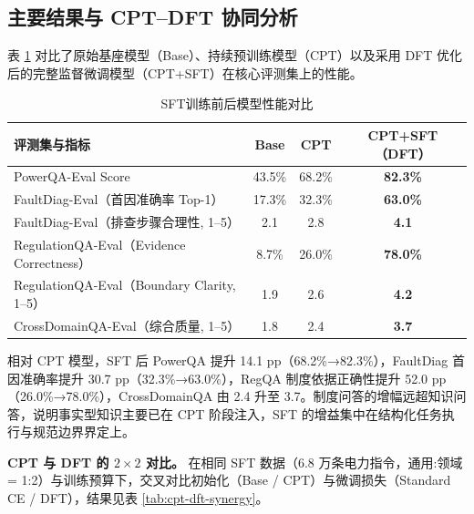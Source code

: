 \documentclass[fontset=fandol,type=master,campus=shenzhen,etitleauto=true]{hithesisbook}
\begin{document}
\subsection{主要结果与 CPT--DFT 协同分析}\label{ux4e3bux8981ux7ed3ux679c-2}

表 \ref{tab:sft-results} 对比了原始基座模型（Base）、持续预训练模型（CPT）以及采用 DFT 优化后的完整监督微调模型（CPT+SFT）在核心评测集上的性能。

\begin{table}[htbp]
\centering
\caption{SFT训练前后模型性能对比}
\label{tab:sft-results}
\small
\begin{tabular}{l c c c}
\toprule
\textbf{评测集与指标} & \textbf{Base} & \textbf{CPT} & \textbf{CPT+SFT（DFT）} \\
\midrule
PowerQA-Eval Score & 43.5\% & 68.2\% & \textbf{82.3\%} \\
FaultDiag-Eval（首因准确率 Top-1） & 17.3\% & 32.3\% & \textbf{63.0\%} \\
FaultDiag-Eval（排查步骤合理性, 1--5） & 2.1 & 2.8 & \textbf{4.1} \\
RegulationQA-Eval（Evidence Correctness） & 8.7\% & 26.0\% & \textbf{78.0\%} \\
RegulationQA-Eval（Boundary Clarity, 1--5） & 1.9 & 2.6 & \textbf{4.2} \\
CrossDomainQA-Eval（综合质量, 1--5） & 1.8 & 2.4 & \textbf{3.7} \\
\bottomrule
\end{tabular}
\end{table}

相对 CPT 模型，SFT 后 PowerQA 提升 14.1 pp（68.2\%→82.3\%），FaultDiag 首因准确率提升 30.7 pp（32.3\%→63.0\%），RegQA 制度依据正确性提升 52.0 pp（26.0\%→78.0\%），CrossDomainQA 由 2.4 升至 3.7。制度问答的增幅远超知识问答，说明事实型知识主要已在 CPT 阶段注入，SFT 的增益集中在结构化任务执行与规范边界界定上。

\textbf{CPT 与 DFT 的 $2 \times 2$ 对比。} 在相同 SFT 数据（6.8 万条电力指令，通用:领域 = 1:2）与训练预算下，交叉对比初始化（Base / CPT）与微调损失（Standard CE / DFT），结果见表 \ref{tab:cpt-dft-synergy}。
\end{document}
